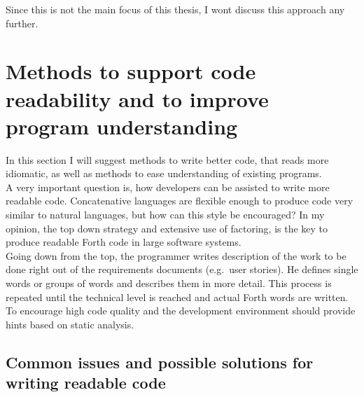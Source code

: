 Since this is not the main focus of this thesis, I wont discuss this approach any further.

\section{Methods to support code readability and to improve program understanding}

In this section I will suggest methods to write better code, that reads more idiomatic, as well as methods to ease understanding of existing programs.
\\
A very important question is, how developers can be assisted to write more readable code. Concatenative languages are flexible enough to produce code very similar to natural languages, but how can this style be encouraged? In my opinion, the top down strategy and extensive use of factoring, is the key to produce readable Forth code in large software systems.
\\
Going down from the top, the programmer writes description of the work to be done right out of the requirements documents (e.g.\ user stories). He defines single words or groups of words and describes them in more detail. This process is repeated until the technical level is reached and actual Forth words are written.
\\
To encourage high code quality and the development environment should provide hints based on static analysis.

\subsection{Common issues and possible solutions for writing readable code}


